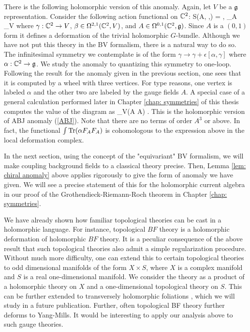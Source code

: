\documentclass[10pt]{article}
\begin{document}
There is the following holomorphic version of this anomaly. 
Again, let $V$ be a $\mathfrak g$ representation.
Consider the following action functional on $\mathbb C^2$:
\ben
S(A, \beta,\gamma) = \int \<\beta, \dbar_A \gamma\>_V
\een
where $\gamma : \mathbb C^2 \to V$, $\beta \in \Omega^{2,1}(\mathbb C^2 , V)$, and $A \in \Omega^{0,1}(\mathbb C^2, \mathfrak g)$. 
Since $A$ is a $(0,1)$ form it defines a deformation of the trivial holomorphic $G$-bundle. 
Although we have not put this theory in the BV formalism, there is a natural way to do so. 
The infinitesimal symmetry we contemplate is of the form $\gamma \to \gamma + \epsilon [\alpha, \gamma]$ where $\alpha : \mathbb C^2 \to \mathfrak g$. 
We study the anomaly to quantizing this symmetry to one-loop.
Following the result for the anomaly given in the previous section, one sees that it is computed by a wheel with three vertices. 
For type reasons, one vertex is labeled $\alpha$ and the other two are labeled by the gauge fields $A$.
A special case of a general calculation performed later in Chapter \ref{chap: symmetries} of this thesis computes the value of the diagram as
\ben
{}_V(\alpha \partial A \partial A) .
\een
This is the holomorphic version of ABJ anomaly (\ref{ABJ}). 
Note that there are no terms of order $A^3$ or above. 
In fact, the functional $\int {\rm Tr}(\alpha F_A F_A)$ is cohomologous to the expression above in the local deformation complex.

\begin{rmk} 
In the next section, using the concept of the "equivariant" BV formalism, we will make coupling background fields to a classical theory precise. 
Then, Lemma \ref{lem: chiral anomaly} above applies rigorously to give the form of anomaly we have given. 
We will see a precise statement of this for the holomorphic current algebra in our proof of the Grothendieck-Riemann-Roch theorem in Chapter \ref{chap: symmetries}.
\end{rmk}

\begin{rmk} 
We have already shown how familiar topological theories can be cast in a holomorphic language.
For instance, topological $BF$ theory is a holomorphic deformation of holomorphic $BF$ theory. 
It is a peculiar consequence of the above result that such topological theories also admit a simple regularization procedure. 
Without much more difficulty, one can extend this to certain topological theories to odd dimensional manifolds of the form $X \times S$, where $X$ is a complex manifold and $S$ is a real one-dimensional manifold. 
We consider the theory as a product of a holomorphic theory on $X$ and a one-dimensional topological theory on $S$. 
This can be further extended to transversely holomorphic foliations \cite{THF1,THF2}, which we will study in a future publication.
Further, often topological BF theory further deforms to Yang-Mills.
It would be interesting to apply our analysis above to such gauge theories. 
\end{rmk}
\end{document}
